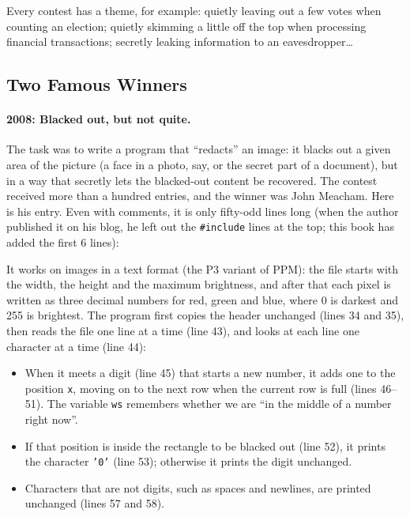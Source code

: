 Every contest has a theme, for example: quietly leaving out a few votes when counting an election; quietly skimming a little off the top when processing financial transactions; secretly leaking information to an eavesdropper\ldots{}

\subsection{Two Famous Winners}

\paragraph{2008: Blacked out, but not quite.}
The task was to write a program that ``redacts'' an image: it blacks out a given area of the picture (a face in a photo, say, or the secret part of a document), but in a way that secretly lets the blacked-out content be recovered. The contest received more than a hundred entries, and the winner was John Meacham. Here is his entry. Even with comments, it is only fifty-odd lines long (when the author published it on his blog, he left out the \texttt{\#include} lines at the top; this book has added the first 6 lines):


It works on images in a text format (the P3 variant of PPM): the file starts with the width, the height and the maximum brightness, and after that each pixel is written as three decimal numbers for red, green and blue, where 0 is darkest and 255 is brightest. The program first copies the header unchanged (lines 34 and 35), then reads the file one line at a time (line 43), and looks at each line one character at a time (line 44):
\begin{itemize}
  \item When it meets a digit (line 45) that starts a new number, it adds one to the position \texttt{x}, moving on to the next row when the current row is full (lines 46--51). The variable \texttt{ws} remembers whether we are ``in the middle of a number right now''.
  \item If that position is inside the rectangle to be blacked out (line 52), it prints the character \texttt{'0'} (line 53); otherwise it prints the digit unchanged.
  \item Characters that are not digits, such as spaces and newlines, are printed unchanged (lines 57 and 58).
\end{itemize}

